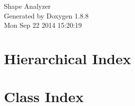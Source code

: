 \documentclass[twoside]{book}
\newcommand{\+}{\discretionary{\mbox{\scriptsize$\hookleftarrow$}}{}{}}
\newcommand{\clearemptydoublepage}{%
  \newpage{\pagestyle{empty}\cleardoublepage}%
}
\begin{document}
\hypersetup{pageanchor=false,
             bookmarks=true,
             bookmarksnumbered=true,
             pdfencoding=unicode
            }
\begin{titlepage}
\vspace*{7cm}
\begin{center}%
{\Large Shape Analyzer }\\
\vspace*{1cm}
{\large Generated by Doxygen 1.8.8}\\
\vspace*{0.5cm}
{\small Mon Sep 22 2014 15:20:19}\\
\end{center}
\end{titlepage}
\clearemptydoublepage
\tableofcontents
\clearemptydoublepage
{}
\hypersetup{pageanchor=true}

\chapter{Hierarchical Index}

\chapter{Class Index}

\end{document}
